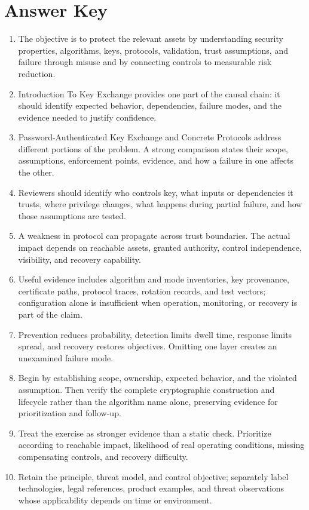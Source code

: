 \documentclass[11pt,letterpaper]{article}
\begin{document}
\section*{Answer Key}
\begin{enumerate}
\item The objective is to protect the relevant assets by understanding security properties, algorithms, keys, protocols, validation, trust assumptions, and failure through misuse and by connecting controls to measurable risk reduction.
\item Introduction To Key Exchange provides one part of the causal chain: it should identify expected behavior, dependencies, failure modes, and the evidence needed to justify confidence.
\item Password-Authenticated Key Exchange and Concrete Protocols address different portions of the problem. A strong comparison states their scope, assumptions, enforcement points, evidence, and how a failure in one affects the other.
\item Reviewers should identify who controls key, what inputs or dependencies it trusts, where privilege changes, what happens during partial failure, and how those assumptions are tested.
\item A weakness in protocol can propagate across trust boundaries. The actual impact depends on reachable assets, granted authority, control independence, visibility, and recovery capability.
\item Useful evidence includes algorithm and mode inventories, key provenance, certificate paths, protocol traces, rotation records, and test vectors; configuration alone is insufficient when operation, monitoring, or recovery is part of the claim.
\item Prevention reduces probability, detection limits dwell time, response limits spread, and recovery restores objectives. Omitting one layer creates an unexamined failure mode.
\item Begin by establishing scope, ownership, expected behavior, and the violated assumption. Then verify the complete cryptographic construction and lifecycle rather than the algorithm name alone, preserving evidence for prioritization and follow-up.
\item Treat the exercise as stronger evidence than a static check. Prioritize according to reachable impact, likelihood of real operating conditions, missing compensating controls, and recovery difficulty.
\item Retain the principle, threat model, and control objective; separately label technologies, legal references, product examples, and threat observations whose applicability depends on time or environment.
\end{enumerate}
\end{document}
